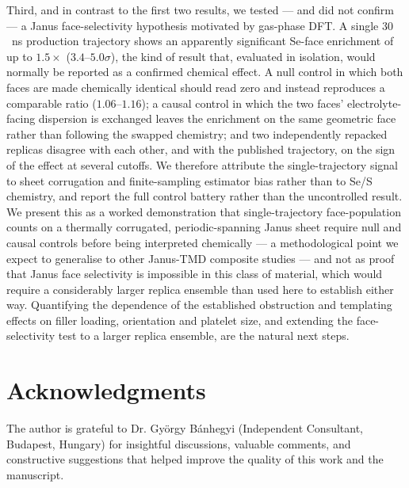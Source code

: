 \documentclass[review, 12pt]{elsarticle}
\numberwithin{equation}{section}
\begin{document}
Third, and in contrast to the first two results, we tested --- and did not confirm --- a Janus face-selectivity hypothesis motivated by gas-phase DFT. A single $30$~ns production trajectory shows an apparently significant Se-face enrichment of up to $1.5\times$ ($3.4$--$5.0\sigma$), the kind of result that, evaluated in isolation, would normally be reported as a confirmed chemical effect. A null control in which both faces are made chemically identical should read zero and instead reproduces a comparable ratio ($1.06$--$1.16$); a causal control in which the two faces' electrolyte-facing dispersion is exchanged leaves the enrichment on the same geometric face rather than following the swapped chemistry; and two independently repacked replicas disagree with each other, and with the published trajectory, on the sign of the effect at several cutoffs. We therefore attribute the single-trajectory signal to sheet corrugation and finite-sampling estimator bias rather than to Se/S chemistry, and report the full control battery rather than the uncontrolled result. We present this as a worked demonstration that single-trajectory face-population counts on a thermally corrugated, periodic-spanning Janus sheet require null and causal controls before being interpreted chemically --- a methodological point we expect to generalise to other Janus-TMD composite studies --- and not as proof that Janus face selectivity is impossible in this class of material, which would require a considerably larger replica ensemble than used here to establish either way. Quantifying the dependence of the established obstruction and templating effects on filler loading, orientation and platelet size, and extending the face-selectivity test to a larger replica ensemble, are the natural next steps.

\section*{Acknowledgments}

The author is  grateful to Dr. Gy\"orgy B\'anhegyi (Independent Consultant, Budapest, Hungary) for insightful discussions, valuable comments, and constructive suggestions that helped improve the quality of this work and the manuscript.


\end{document}
